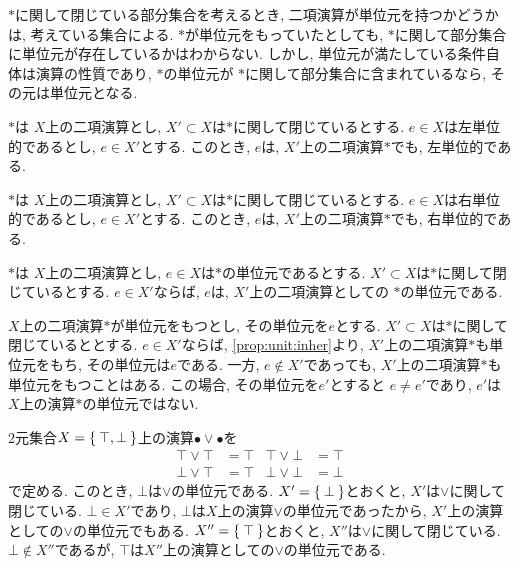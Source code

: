 $\ast$に関して閉じている部分集合を考えるとき,
二項演算が単位元を持つかどうかは,
考えている集合による.
$\ast$が単位元をもっていたとしても,
$\ast$に関して部分集合に単位元が存在しているかはわからない.
しかし,
単位元が満たしている条件自体は演算の性質であり,
$\ast$の単位元が
$\ast$に関して部分集合に含まれているなら,
その元は単位元となる.
\begin{prop}
  $\ast$は
  $X$上の二項演算とし,
  $X'\subset X$は$\ast$に関して閉じているとする.
  $e\in X$は左単位的であるとし,
  $e\in X'$とする.
  このとき,
  $e$は,
  $X'$上の二項演算$\ast$でも,
  左単位的である.
\end{prop}
\begin{prop}
  $\ast$は
  $X$上の二項演算とし,
  $X'\subset X$は$\ast$に関して閉じているとする.
  $e\in X$は右単位的であるとし,
  $e\in X'$とする.
  このとき,
  $e$は,
  $X'$上の二項演算$\ast$でも,
  右単位的である.
\end{prop}
\begin{prop}
  \label{prop:unit:inher}
  $\ast$は
  $X$上の二項演算とし,
  $e\in X$は$\ast$の単位元であるとする.
  $X'\subset X$は$\ast$に関して閉じているとする.
  $e\in X'$ならば,
  $e$は,
  $X'$上の二項演算としての
  $\ast$の単位元である.
\end{prop}
\begin{remark}
  $X$上の二項演算$\ast$が単位元をもつとし,
  その単位元を$e$とする.
  $X'\subset X$は$\ast$に関して閉じているととする.
  $e\in X'$ならば,
  \cref{prop:unit:inher}より,
  $X'$上の二項演算$\ast$も単位元をもち,
  その単位元は$e$である.
  一方, $e\not\in X'$であっても,
  $X'$上の二項演算$\ast$も単位元をもつことはある.
  この場合,
  その単位元を$e'$とすると
  $e\neq e'$であり, $e'$は$X$上の演算$\ast$の単位元ではない.
\end{remark}
\begin{example}
  $2$元集合$X=\Set{\top, \bot}$上の演算$\bullet\lor\bullet$を
  \begin{align*}
   {\top \lor \top} &= \top&
   {\top \lor \bot} &= \top\\
   {\bot \lor \top} &= \top&
   {\bot \lor \bot} &= \bot    
  \end{align*}
  で定める.
  このとき, $\bot$は$\lor$の単位元である.
  $X'=\Set{\bot}$とおくと, $X'$は$\lor$に関して閉じている.
  $\bot \in X'$であり, $\bot$は$X$上の演算$\lor$の単位元であったから,
  $X'$上の演算としての$\lor$の単位元でもある.
  $X''=\Set{\top}$とおくと, $X''$は$\lor$に関して閉じている.
  $\bot\not\in X''$であるが,
  $\top$は$X''$上の演算としての$\lor$の単位元である.
\end{example}

